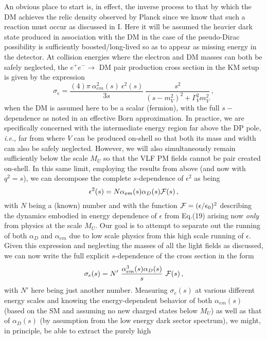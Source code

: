 \documentclass[14pt]{article}
\def\ie{{\it i.e.}}
\def\to{\rightarrow}
\begin{document}
{An obvious place to start is, in effect, the inverse process to that by which the DM achieves the relic density observed by Planck since we know that such a reaction must occur as discussed in I. 
Here it will be  assumed the heavier dark state produced in association with the DM in the case of the pseudo-Dirac possibility is sufficiently boosted/long-lived so as to appear as missing energy in the 
detector. At collision energies where the electron and DM masses can both be safely neglected, the $e^+e^- \to$ DM pair production cross section in the KM setup is given by the expression 
%
\begin{equation}
\sigma_e=\frac{(4)\pi ~\alpha_{em}^2 (s)~\epsilon^2(s)}{3s}~\frac{s^2}{(s-m_V^2)^2+\Gamma_V^2m_V^2}\,,  
\end{equation}
%
when the DM is assumed here to be a scalar (fermion), with the full $s-$dependence as noted in an effective Born approximation. 
In practice, we are specifically concerned with the intermediate energy region far above the DP 
pole, \ie, far from where $V$ can be produced on-shell so that both its mass and width can also be safely neglected. However, we will also simultaneously remain sufficiently below the scale $M_U$ so 
that the VLF PM fields cannot be pair created on-shell. In this same limit, employing the results from above (and now with $q^2=s$), we can decompose the complete $s$-dependence of $\epsilon^2$ as 
being 
%
\begin{equation}
\epsilon^2(s)=N\alpha_{em}(s)\alpha_D(s){\cal F}(s)\,,
\end{equation}
%
with $N$ being a (known) number and with the function ${\cal F}=(\epsilon/\epsilon_0)^2$ describing the dynamics embodied in energy dependence of $\epsilon$ from Eq.(19) arising now {\it only} from 
physics at the scale $M_U$.  Our goal is to attempt to separate out the running of both $\alpha_D$ and $\alpha_{em}$ due to low scale physics from this high scale running of $\epsilon$. 
Given this expression and neglecting the masses of all the light fields as discussed, we can now write the full explicit $s$-dependence of the cross section in the form 
%
\begin{equation}
\sigma_e(s)=N'~\frac{\alpha_{em}^3 (s)\alpha_D(s)}{s}~{\cal F}(s)\,,
\end{equation}
%
with $N'$ here being just another number. Measuring $\sigma_e(s)$ at various different energy scales and knowing the energy-dependent behavior of both $\alpha_{em}(s)$ (based on the SM 
and assuming no new charged states below $M_U$) as well as that of $\alpha_D(s)$ (by assumption from the low energy dark sector spectrum), we might, in principle, be able to extract the purely high 
}
\end{document}
